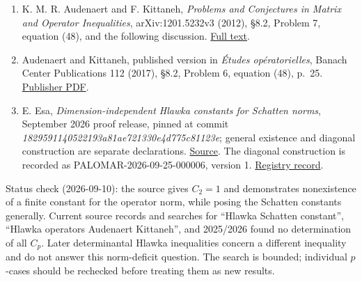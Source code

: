 \documentclass[11pt,a4paper]{article}
\providecommand{\tightlist}{\setlength{\itemsep}{0pt}\setlength{\parskip}{0pt}}
\begin{document}
\begin{enumerate}
\def\labelenumi{\arabic{enumi}.}
\tightlist
\item
  K. M. R. Audenaert and F. Kittaneh, \emph{Problems and Conjectures in
  Matrix and Operator Inequalities}, arXiv:1201.5232v3 (2012), §8.2,
  Problem 7, equation (48), and the following discussion.
  \href{https://arxiv.org/html/1201.5232}{Full text}.
\item
  Audenaert and Kittaneh, published version in \emph{Études
  opératorielles}, Banach Center Publications 112 (2017), §8.2, Problem
  6, equation (48), p.~25.
  \href{https://www.impan.pl/shop/en/publication/transaction/download/product/111309}{Publisher
  PDF}.
\item
  E. Esa, \emph{Dimension-independent Hlawka constants for Schatten
  norms}, September 2026 proof release, pinned at commit
  \textit{1829591140522193a81ae721330e4d775c81123e}; general existence
  and diagonal construction are separate declarations.
  \href{https://github.com/savarin/hlawka-schatten/tree/1829591140522193a81ae721330e4d775c81123e}{Source}.
  The diagonal construction is recorded as PALOMAR-2026-09-25-000006,
  version 1.
  \href{https://palomar-registry.org/entry?id=PALOMAR-2026-09-25-000006&version=1}{Registry
  record}.
\end{enumerate}

Status check (2026-09-10): the source gives \(C_2=1\) and demonstrates
nonexistence of a finite constant for the operator norm, while posing
the Schatten constants generally. Current source records and searches
for ``Hlawka Schatten constant'', ``Hlawka operators Audenaert
Kittaneh'', and 2025/2026 found no determination of all \(C_p\). Later
determinantal Hlawka inequalities concern a different inequality and do
not answer this norm-deficit question. The search is bounded; individual
\(p\)-cases should be rechecked before treating them as new results.
\end{document}
